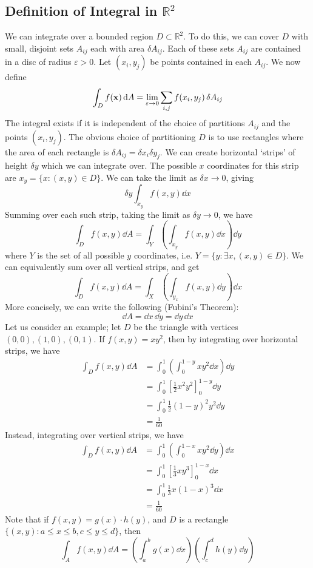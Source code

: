 \subsection{Definition of Integral in \(\mathbb R^2\)}
We can integrate over a bounded region \(D \subset \mathbb R^2\). To do this, we can cover \(D\) with small, disjoint sets \(A_{ij}\) each with area \(\delta A_{ij}\). Each of these sets \(A_{ij}\) are contained in a disc of radius \(\varepsilon > 0\). Let \((x_i, y_j)\) be points contained in each \(A_{ij}\). We now define
\[ \int_D f(\vb x) \dd{A} = \lim_{\varepsilon \to 0} \sum_{i, j} f(x_i, y_j) \,\delta A_{ij} \]
The integral exists if it is independent of the choice of partitions \(A_{ij}\) and the points \((x_i, y_j)\). The obvious choice of partitioning \(D\) is to use rectangles where the area of each rectangle is \(\delta A_{ij} = \delta x_i \delta y_j\). We can create horizontal `strips' of height \(\delta y\) which we can integrate over. The possible \(x\) coordinates for this strip are \(x_y = \{ x \colon (x, y) \in D \}\). We can take the limit as \(\delta x \to 0\), giving
\[ \delta y \int_{x_y} f(x, y) \dd{x} \]
Summing over each such strip, taking the limit as \(\delta y \to 0\), we have
\[ \int_D f(x, y) \dd{A} = \int_Y \left( \int_{x_y} f(x, y) \dd{x} \right) \dd{y} \]
where \(Y\) is the set of all possible \(y\) coordinates, i.e. \(Y = \{ y \colon \exists x, (x, y) \in D \}\). We can equivalently sum over all vertical strips, and get
\[ \int_D f(x, y) \dd{A} = \int_X \left( \int_{y_x} f(x, y) \dd{y} \right) \dd{x} \]
More concisely, we can write the following (Fubini's Theorem):
\[ \dd{A} = \dd{x} \, \dd{y} = \dd{y} \, \dd{x} \]
Let us consider an example; let \(D\) be the triangle with vertices \((0, 0), (1, 0), (0, 1)\). If \(f(x, y) = xy^2\), then by integrating over horizontal strips, we have
\begin{align*}
	\int_D f(x, y) \dd{A} & = \int_0^1 \left( \int_0^{1-y} xy^2 \dd{x} \right) \dd{y}  \\
	                      & = \int_0^1 \left[ \frac{1}{2}x^2y^2 \right]_0^{1-y} \dd{y} \\
	                      & = \int_0^1 \frac{1}{2}(1-y)^2y^2 \dd{y}                    \\
	                      & = \frac{1}{60}
\end{align*}
Instead, integrating over vertical strips, we have
\begin{align*}
	\int_D f(x, y) \dd{A} & = \int_0^1 \left( \int_0^{1-x} xy^2 \dd{y} \right) \dd{x} \\
	                      & = \int_0^1 \left[ \frac{1}{3} xy^3 \right]_0^{1-x} \dd{x} \\
	                      & = \int_0^1 \frac{1}{3} x(1-x)^3 \dd{x}                    \\
	                      & = \frac{1}{60}
\end{align*}
Note that if \(f(x, y) = g(x) \cdot h(y)\), and \(D\) is a rectangle \(\{ (x, y) \colon a \leq x \leq b, c \leq y \leq d \}\), then
\[ \int_A f(x, y) \dd{A} = \left( \int_a^b g(x) \dd{x} \right)\left( \int_c^d h(y) \dd{y} \right) \]

